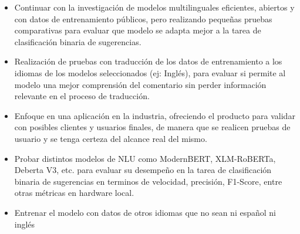 \begin{itemize}
    \item Continuar con la investigación de modelos multilinguales eficientes, abiertos y con datos de entrenamiento públicos, pero realizando pequeñas pruebas comparativas para evaluar que modelo se adapta mejor a la tarea de clasificación binaria de sugerencias.
    \item Realización de pruebas con traducción de los datos de entrenamiento a los idiomas de los modelos seleccionados (ej: Inglés), para evaluar si permite al modelo una mejor comprensión del comentario sin perder información relevante en el proceso de traducción.
    \item Enfoque en una aplicación en la industria, ofreciendo el producto para validar con posibles clientes y usuarios finales, de manera que se realicen pruebas de usuario y se tenga certeza del alcance real del mismo.
    \item Probar distintos modelos de NLU como ModernBERT, XLM-RoBERTa, Deberta V3, etc. para evaluar su desempeño en la tarea de clasificación binaria de sugerencias en terminos de velocidad, precisión, F1-Score, entre otras métricas en hardware local.
    \item Entrenar el modelo con datos de otros idiomas que no sean ni español ni inglés
     
\end{itemize}
    
